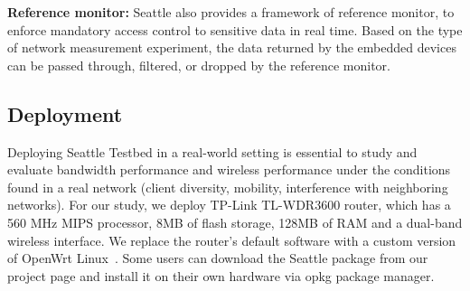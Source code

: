 \textbf{Reference monitor:}
Seattle also provides a framework of reference monitor, to enforce mandatory 
access control to sensitive data in real time. Based on the type of network 
measurement experiment, the data returned by the embedded devices can be 
passed through, filtered, or dropped by the reference monitor.

\subsection{Deployment}
Deploying Seattle Testbed in a real-world setting is essential to study and 
evaluate bandwidth performance and wireless performance under the conditions 
found in a real network (client diversity, mobility, interference with 
neighboring networks). For our study, we deploy TP-Link TL-WDR3600 router, 
which has a 560 MHz MIPS processor, 8MB of flash storage, 128MB of RAM and a 
dual-band wireless interface. We replace the router’s default software with 
a custom version of OpenWrt Linux~\cite{openwrt}. Some users can download 
the Seattle package from our project page and install it on their own 
hardware via opkg package manager.

